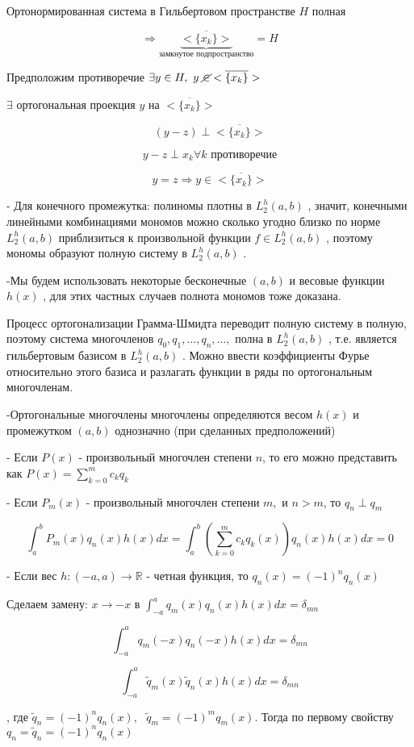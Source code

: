 \documentclass[12pt, a4paper]{report}
\begin{document}
Ортонормированная система в Гильбертовом пространстве \( H \) полная 

\[ \Rightarrow \underbrace{<\overline{\{x_k \}}  >}_{\text{замкнутое подпространство} } =H \] 

Предположим противоречие \( \exists  y \in  H , \text{ } y \text{ } \cancel{\in } <\overline{\{x_k \}}  > \) 

\( \exists   \) ортогональная  проекция  \( y  \) на \( <\overline{\{x_k \}}  > \) 

\[ (y -z )  \perp <\overline{\{x_k \}}  > \] 

\[ y- z \perp  x_k \forall  k \text{ противоречие}  \] 

\[ y = z \Rightarrow y \in <\overline{\{x_k \}}  > \] 

- Для конечного промежутка: полиномы плотны в \( L_2 ^h (a,b ) \) , значит, конечными линейными комбинациями мономов можно сколько угодно близко по норме \(  L_2 ^h (a,b ) \)  приблизиться к произвольной функции \( f \in  L_2 ^h (a,b ) \) , поэтому мономы образуют полную систему в \(  L_2 ^h (a,b ) \) . 

-Мы будем использовать некоторые бесконечные \( (a,b) \)  и весовые функции \( h(x) \) , для этих частных случаев полнота мономов тоже доказана. 

Процесс ортогонализации Грамма-Шмидта переводит полную систему в полную, поэтому система многочленов \(  q_0,q_1, \ldots, q_n, \ldots, \)  полна в \(  L_2 ^h (a,b ) \) , т.е. является гильбертовым базисом в \(  L_2 ^h (a,b ) \) . Можно ввести коэффициенты Фурье относительно этого базиса и разлагать функции в ряды по ортогональным многочленам.

-Ортогональные многочлены многочлены определяются весом \( h(x ) \) и промежутком \( (a,b) \) однозначно (при сделанных предположений)

- Если \( P(x ) \) - произвольный многочлен степени \( n \), то его можно представить как \( P(x ) = \displaystyle  \sum_{k=0 }^ m c_k q_k \)  

- Если \( P_m(x ) \)  - произвольный многочлен степени \( m , \) и \( n>m \), то \( q_n \perp  q_m \) 

\[ \displaystyle  \int_{a }^{b } P_m(x ) q_n (x )h(x )dx = \int_{a }^{b      } \left( \sum_{k =0 }^m c_k q_k(x ) \right) q_n(x ) h(x ) dx = 0 \] 

- Если вес \( h: (-a , a ) \to  \mathbb{R} \) - четная функция, то \( q_n(x ) =(-1 )^n q_n (x ) \)

Сделаем замену: \( x \to  -x \text{ в }  \displaystyle  \int_{-a }^ a q_m (x )q_n(x )h(x )dx = \delta_{{mn}} \)

\[ \int_{-a }^{a } q_m (-x )q_n (-x )h(x )dx = \delta_{mn}  \]

\[ \int_{-a }^{a } \tilde{q }_m (x )\tilde{q }_n (x )h(x )dx = \delta_{mn} \] 

, где \( \tilde{q }_n =(-1 )^n q_n(x ), \text{ } \tilde{ q}_m = (-1 )^m q_m(x ) \). Тогда по первому свойству \( q_n = \tilde{q }_n = (-1 )^n q_n(x ) \)  




\ifdefined\mainfile
\else
    
\end{document}
